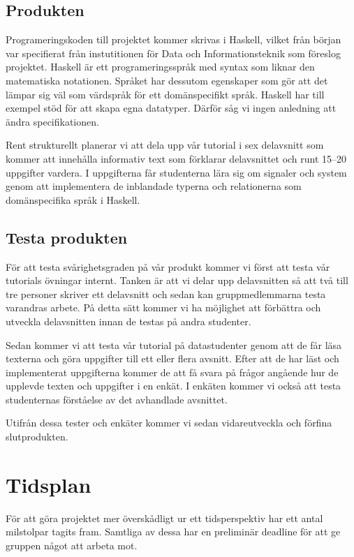 \documentclass{article}
\begin{document}
\subsection{Produkten}
Programeringskoden till projektet kommer skrivas i Haskell,
vilket från början var specifierat från instutitionen för
Data och Informationsteknik som föreslog projektet.
Haskell är ett programeringsspråk med syntax som liknar den
matematiska notationen. Språket har dessutom egenskaper
som gör att det lämpar sig väl som värdspråk för ett domänspecifikt språk.
Haskell har till exempel stöd för att skapa egna datatyper.
Därför såg vi ingen anledning att ändra specifikationen.

Rent strukturellt planerar vi att dela upp vår tutorial i
sex delavsnitt som kommer att innehålla informativ text som
förklarar delavsnittet och runt 15--20 uppgifter vardera.
I uppgifterna får studenterna lära sig om signaler och
system genom att implementera de inblandade typerna
och relationerna som domänspecifika språk i Haskell.

\subsection{Testa produkten}
För att testa svårighetsgraden på vår produkt kommer vi
först att testa vår tutorials övningar internt. Tanken är att
vi delar upp delavsnitten så att två till tre personer
skriver ett delavsnitt och sedan kan gruppmedlemmarna testa
varandras arbete. På detta sätt kommer vi ha möjlighet att
förbättra och utveckla delavsnitten innan de
testas på andra studenter.

Sedan kommer vi att testa vår tutorial på datastudenter genom
att de får läsa texterna och göra uppgifter till ett eller flera avsnitt.
Efter att de har läst och implementerat uppgifterna kommer de att få svara på
frågor angående hur de upplevde texten och uppgifter i en enkät.
I enkäten kommer vi också att testa studenternas förståelse av det avhandlade avsnittet.

Utifrån dessa tester och enkäter kommer vi sedan vidareutveckla och förfina slutprodukten.

\section{Tidsplan}
För att göra projektet mer överskådligt ur ett
tidsperspektiv har ett antal milstolpar tagits fram.
Samtliga av dessa har en preliminär deadline för
att ge gruppen något att arbeta mot.
\end{document}
